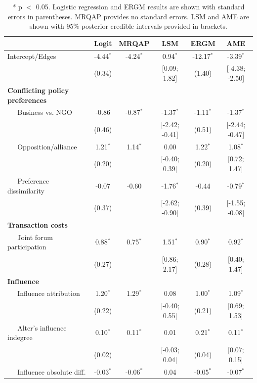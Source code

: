 \documentclass[9pt,twocolumn,twoside,lineno]{pnas-new}
\begin{document}
\begin{table}[ht]
\centering
\caption{* p $<$ 0.05. Logistic regression and ERGM results are shown with standard errors in parentheses. MRQAP provides no standard errors. LSM and AME are shown with 95\% posterior credible intervals provided in brackets.}
\begin{tabular}{lccccc}
   & Logit & MRQAP & LSM & ERGM & AME \\
  \hline
\hline
Intercept/Edges & -4.44$^{\ast}$ & -4.24$^{\ast}$ & 0.94$^{\ast}$ & -12.17$^{\ast}$ & -3.39$^{\ast}$ \\
   & (0.34) &  & [0.09; 1.82] & (1.40) & [-4.38; -2.50] \\
  \textbf{Conflicting policy preferences} &  &  &  &  &  \\
  $\;\;\;\;$ Business vs. NGO & -0.86 & -0.87$^{\ast}$ & -1.37$^{\ast}$ & -1.11$^{\ast}$ & -1.37$^{\ast}$ \\
   & (0.46) &  & [-2.42; -0.41] & (0.51) & [-2.44; -0.47] \\
  $\;\;\;\;$ Opposition/alliance & 1.21$^{\ast}$ & 1.14$^{\ast}$ & 0.00 & 1.22$^{\ast}$ & 1.08$^{\ast}$ \\
   & (0.20) &  & [-0.40; 0.39] & (0.20) & [0.72; 1.47] \\
  $\;\;\;\;$ Preference dissimilarity & -0.07 & -0.60 & -1.76$^{\ast}$ & -0.44 & -0.79$^{\ast}$ \\
   & (0.37) &  & [-2.62; -0.90] & (0.39) & [-1.55; -0.08] \\
  \textbf{Transaction costs} &  &  &  &  &  \\
  $\;\;\;\;$ Joint forum participation & 0.88$^{\ast}$ & 0.75$^{\ast}$ & 1.51$^{\ast}$ & 0.90$^{\ast}$ & 0.92$^{\ast}$ \\
   & (0.27) &  & [0.86; 2.17] & (0.28) & [0.40; 1.47] \\
  \textbf{Influence} &  &  &  &  &  \\
  $\;\;\;\;$ Influence attribution & 1.20$^{\ast}$ & 1.29$^{\ast}$ & 0.08 & 1.00$^{\ast}$ & 1.09$^{\ast}$ \\
   & (0.22) &  & [-0.40; 0.55] & (0.21) & [0.69; 1.53] \\
  $\;\;\;\;$ Alter's influence indegree & 0.10$^{\ast}$ & 0.11$^{\ast}$ & 0.01 & 0.21$^{\ast}$ & 0.11$^{\ast}$ \\
   & (0.02) &  & [-0.03; 0.04] & (0.04) & [0.07; 0.15] \\
  $\;\;\;\;$ Influence absolute diff. & -0.03$^{\ast}$ & -0.06$^{\ast}$ & 0.04 & -0.05$^{\ast}$ & -0.07$^{\ast}$ \\

\end{tabular}
\end{table}
\end{document}
